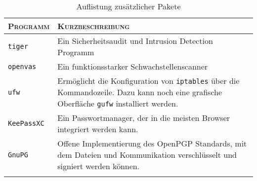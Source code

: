 \begin{longtable}{p{}|p{}}
	\toprule
	{\large\textsc{Programm}} & {\large\textsc{Kurzbeschreibung}} \\
	\midrule[1pt]
	\texttt{tiger}\cite{TigerUNIXSecurity} & Ein Sicherheitsaudit und Intrusion Detection Programm \\
	\midrule
	\texttt{openvas}\cite{OpenVASOpenVulnerability} & Ein funktionsstarker Schwachstellenscanner \\
	\midrule
	\texttt{ufw}\cite{UfwHomepage} & Ermöglicht die Konfiguration von \texttt{iptables} über die Kommandozeile. Dazu kann noch eine grafische Oberfläche \texttt{gufw} installiert werden. \\
	\midrule
	\texttt{KeePassXC}\cite{KeePassXCPasswordManager} & Ein Passwortmanager, der in die meisten Browser integriert werden kann. \\
	\midrule
	\texttt{GnuPG}\cite{GNUPrivacyGuard2020} & Offene Implementierung des OpenPGP Standards, mit dem Dateien und Kommunikation verschlüsselt und signiert werden können. \\
	\bottomrule
	\caption{Auflistung zusätzlicher Pakete}
	\label{tab:software}
\end{longtable}

